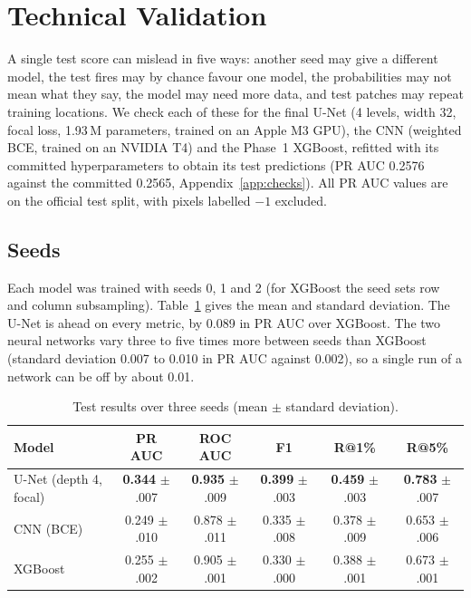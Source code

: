 
\section{Technical Validation}
\label{sec:dl_validation}

A single test score can mislead in five ways: another seed may give a different model, the test fires may
by chance favour one model, the probabilities may not mean what they say, the model may need more data, and
test patches may repeat training locations. We check each of these for the final U-Net (4 levels, width 32,
focal loss, 1.93\,M parameters, trained on an Apple M3 GPU), the CNN (weighted BCE, trained on an NVIDIA T4)
and the Phase~1 XGBoost, refitted with its committed hyperparameters to obtain its test predictions (PR AUC
0.2576 against the committed 0.2565, Appendix~\ref{app:checks}). All PR AUC values are on the official test
split, with pixels labelled $-1$ excluded.

\subsection{Seeds}

Each model was trained with seeds 0, 1 and 2 (for XGBoost the seed sets row and column subsampling).
Table~\ref{tab:dl_seeds} gives the mean and standard deviation. The U-Net is ahead on every metric, by
0.089 in PR AUC over XGBoost. The two neural networks vary three to five times more between seeds than
XGBoost (standard deviation 0.007 to 0.010 in PR AUC against 0.002), so a single run of a network can be
off by about 0.01.

\begin{table}[t]
\centering
\caption{Test results over three seeds (mean $\pm$ standard deviation).}
\label{tab:dl_seeds}
\small
\setlength{\tabcolsep}{6pt}
\renewcommand{\arraystretch}{1.12}
\begin{tabular}{lccccc}
\toprule
\rowcolor{tblhead}
\textbf{Model} & \textbf{PR AUC} & \textbf{ROC AUC} & \textbf{F1} & \textbf{R@1\%} & \textbf{R@5\%} \\
\midrule
\rowcolor{tblours}
U-Net (depth 4, focal) & \textbf{0.344} $\pm$ .007 & \textbf{0.935} $\pm$ .009 & \textbf{0.399} $\pm$ .003 & \textbf{0.459} $\pm$ .003 & \textbf{0.783} $\pm$ .007 \\
CNN (BCE) & 0.249 $\pm$ .010 & 0.878 $\pm$ .011 & 0.335 $\pm$ .008 & 0.378 $\pm$ .009 & 0.653 $\pm$ .006 \\
XGBoost & 0.255 $\pm$ .002 & 0.905 $\pm$ .001 & 0.330 $\pm$ .000 & 0.388 $\pm$ .001 & 0.673 $\pm$ .001 \\
\bottomrule
\end{tabular}
\end{table}

